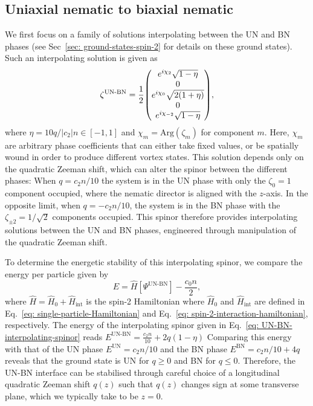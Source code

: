 \subsection{Uniaxial nematic to biaxial nematic}\label{subsec: UN-BN-defects}
We first focus on a family of solutions interpolating between the UN and BN
phases (see Sec~\ref{sec: ground-states-spin-2} for details on these ground
states).
Such an interpolating solution is given as
\begin{align}\label{eq: UN-BN-interpolating-spinor}
    \zeta^\text{UN-BN} = \frac{1}{2}\mqty(
    e^{i\chi_2}\sqrt{1 - \eta} \\
    0 \\
    e^{i\chi_0}\sqrt{2(1+\eta)} \\
    0 \\
    e^{i\chi_{-2}}\sqrt{1 - \eta}
    ),
\end{align}
where \(\eta = 10q /|c_2|n \in [-1, 1]\) and \(\chi_m = \text{Arg}(\zeta_m)\)
for component \(m\).
Here, \(\chi_m\) are arbitrary phase coefficients that can either take fixed
values, or be spatially wound in order to produce different vortex states.
This solution depends only on the quadratic Zeeman shift, which can alter the
spinor between the different phases: When \(q = c_2n / 10\) the system is in the
UN phase with only the \(\zeta_0=1\) component occupied, where the nematic
director is aligned with the \(z\)-axis.
In the opposite limit, when \(q = -c_2n/10\), the system is in the
BN phase with the \(\zeta_{\pm 2} = 1/\sqrt{2}\) components occupied.
This spinor therefore provides interpolating solutions between the UN and BN
phases, engineered through manipulation of the quadratic Zeeman shift.

To determine the energetic stability of this interpolating spinor, we compare
the energy per particle given by~\cite{Kawaguchi2012}
\begin{equation}\label{eq: energy-per-particle}
    E = \hat{H}\left[\Psi^\text{UN-BN}\right] - \frac{c_0n}{2},
\end{equation}
where \(\hat{H} = \hat{H}_0 + \hat{H}_\text{int}\) is the spin-2
Hamiltonian where \(\hat{H}_0\) and \(\hat{H}_\text{int}\)
are defined in Eq.~\eqref{eq: single-particle-Hamiltonian} and
Eq.~\eqref{eq: spin-2-interaction-hamiltonian}, respectively.
The energy of the interpolating spinor given in
Eq.~\eqref{eq: UN-BN-interpolating-spinor} reads
\(E^\text{UN-BN} = \frac{c_2n}{10} + 2q(1 - \eta)\)
Comparing this energy with that of the UN phase
\(E^\text{UN} = c_2n/10\) and the BN phase
\(E^\text{BN} = c_2n/10 + 4q\) reveals that the ground state is UN for
\(q \geq 0\) and BN for \(q \leq 0\).
Therefore, the UN-BN interface can be stabilised through careful choice of
a longitudinal quadratic Zeeman shift \(q(z)\) such that \(q(z)\) changes
sign at some transverse plane, which we typically take to be \(z=0\).

